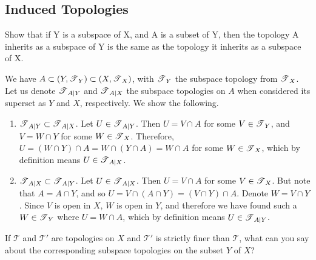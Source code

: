 \subsection{Induced Topologies}

  \begin{exercise}[Munkres 16.1]
    Show that if Y is a subspace of X, and A is a subset of Y, then the topology A inherits as a subspace of Y is the same as the topology it inherits as a subspace of X.
  \end{exercise}
  \begin{solution}[Munkres 16.1]
    We have $A \subset (Y, \operatorname{\mathscr{T}}_Y) \subset (X, \operatorname{\mathscr{T}}_X)$, with $\operatorname{\mathscr{T}}_Y$ the subspace topology from $\operatorname{\mathscr{T}}_X$. Let us denote $\operatorname{\mathscr{T}}_{A|Y}$ and $\operatorname{\mathscr{T}}_{A|X}$ the subspace topologies on $A$ when considered its superset as $Y$ and $X$, respectively. We show the following. 
    \begin{enumerate}
      \item $\operatorname{\mathscr{T}}_{A|Y} \subset \operatorname{\mathscr{T}}_{A|X}$. Let $U \in \operatorname{\mathscr{T}}_{A|Y}$. Then $U = V \cap A$ for some $V \in \operatorname{\mathscr{T}}_Y$, and $V = W \cap Y$ for some $W \in \operatorname{\mathscr{T}}_X$. Therefore, $U = (W \cap Y) \cap A = W \cap (Y \cap A) = W \cap A$ for some $W \in \operatorname{\mathscr{T}}_X$, which by definition means $U \in \operatorname{\mathscr{T}}_{A|X}$. 
      \item $\operatorname{\mathscr{T}}_{A|X} \subset \operatorname{\mathscr{T}}_{A|Y}$. Let $U \in \operatorname{\mathscr{T}}_{A|X}$. Then $U = V \cap A$ for some $V \in \operatorname{\mathscr{T}}_X$. But note that $A = A \cap Y$, and so $U = V \cap (A \cap Y) = (V \cap Y) \cap A$. Denote $W = V \cap Y$. Since $V$ is open in $X$, $W$ is open in $Y$, and therefore we have found such a $W \in \operatorname{\mathscr{T}}_Y$ where $U = W \cap A$, which by definition means $U \in \operatorname{\mathscr{T}}_{A|Y}$. 
    \end{enumerate}
  \end{solution}

  \begin{exercise}[Munkres 16.2]
    If $\mathcal{T}$ and $\mathcal{T}'$ are topologies on $X$ and $\mathcal{T}'$ is strictly finer than $\mathcal{T}$, what can you say about the corresponding subspace topologies on the subset $Y$ of $X$?
  \end{exercise}

